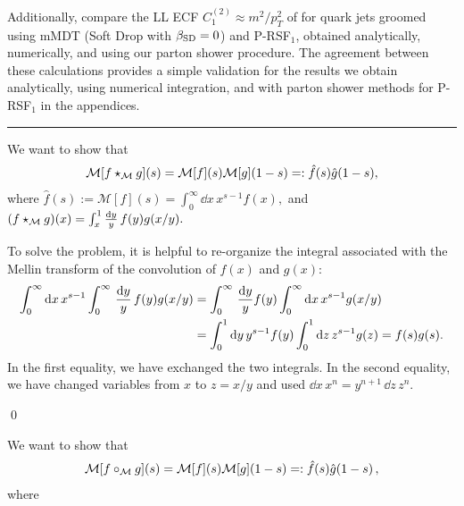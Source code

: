 Additionally,  compare the LL ECF \(C_1^{(2)} \approx m^2 / p_T^2\) of  for quark jets groomed using mMDT (Soft Drop with \(\beta_{\rm SD} = 0\)) and P-RSF\(_1\), obtained analytically, numerically, and using our parton shower procedure.
%
The agreement between these calculations provides a simple validation for the results we obtain analytically, using numerical integration, and with parton shower methods for P-RSF\(_1\) in the appendices.




\vspace{10pt}
\hrule
\vspace{10pt}



We want to show that
\begin{align}
    \mathcal{M}[f \star_{\mathcal M} g](s) = \mathcal{M}[f](s) \mathcal{M}[g](1-s)
    =: \hat{f}(s) \hat{g}(1-s)
    ,
\end{align}
where
\(
    \hat{f}(s) := \mathcal{M}[f](s) = \int_0^\infty \dd x\, x^{s-1} f(x)
    ,
\)
and
\(
    (f \star_{\mathcal M} g)(x)
    =
    \int_x^1 \frac{\dd y}{y}\, f(y) g(x/y)
    .
\)

To solve the problem, it is helpful to re-organize the integral associated with the Mellin transform of the convolution of \(f(x)\) and \(g(x)\):
\begin{align}
    \int_0^\infty \dd x\, x^{s-1}
    \int_0^\infty \,\frac{\dd y}{y}\,
    f(y) g(x/y)
    &=
    \int_0^\infty \,\frac{\dd y}{y}
    f(y)
    \int_0^\infty \dd x\,
    x^{s-1} g(x/y)
    \\
    \notag
    &=
    \int_0^1 \dd y \, y^{s-1} f(y)
    \int_0^1 \dd z\, z^{s-1} g(z)
    =
    f(s) g(s)
    .
\end{align}
In the first equality, we have exchanged the two integrals. %
%
In the second equality, we have changed variables from \(x\) to \(z = x/y\) and used \(\dd x\, x^n = y^{n+1}\, \dd z\, z^n\).

\qed{}


We want to show that
\begin{align}
    \mathcal{M}[f \circ_{\mathcal{M}} g](s) = \mathcal{M}[f](s) \mathcal{M}[g](1-s)
    =:
    \hat{f}(s) \hat{g}(1-s)
    \,,
\end{align}
where

